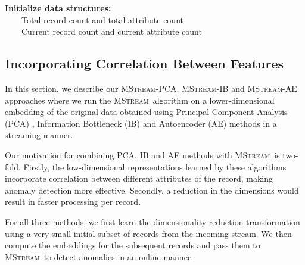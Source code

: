 \documentclass[sigconf]{acmart}
\newcommand{\method}{\textsc{MStream}}
\begin{document}
\begin{algorithm}
	\caption{\method:\ Streaming Anomaly Scoring \label{alg:mstream}}
	{\bf  Initialize data structures:} \\
	\ \ \ \ Total record count  and total attribute count  \\
	\ \ \ \ Current record count  and current attribute count   \\
\end{algorithm}


\subsection{Incorporating Correlation Between Features}
\label{sec:mstreamae}

In this section, we describe our \method-PCA, \method-IB and \method-AE approaches where we run the \method\ algorithm on a lower-dimensional embedding of the original data obtained using Principal Component Analysis (PCA) \cite{pearson1901liii}, Information Bottleneck (IB) \cite{tishby2000information} and Autoencoder (AE) \cite{hinton1994autoencoders} methods in a streaming manner.

Our motivation for combining PCA, IB and AE methods with \method\ is two-fold. Firstly, the low-dimensional representations learned by these algorithms incorporate correlation between different attributes of the record, making anomaly detection more effective. Secondly, a reduction in the dimensions would result in faster processing per record.

For all three methods, we first learn the dimensionality reduction transformation using a very small initial subset of  records from the incoming stream. We then compute the embeddings for the subsequent records and pass them to \method\ to detect anomalies in an online manner.
\end{document}
